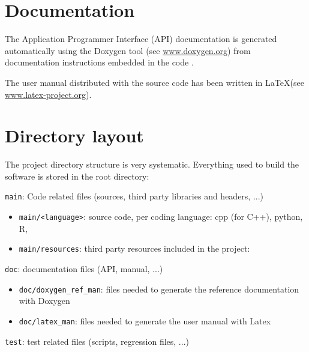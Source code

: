 %
\section{Documentation}
\label{section:documentation}

The Application Programmer Interface (API) documentation is generated automatically 
using the Doxygen tool (see \url{www.doxygen.org}) from documentation instructions 
embedded in the code . 

The user manual distributed with the source code has been written in \LaTeX (see \url{www.latex-project.org}).



%
\section{Directory layout}

The project directory structure is very systematic.
Everything used to build the software is stored in the root directory:
\begin{compactitem}
    \item \texttt{main}: Code related files (sources, third party libraries and headers, ...)
      	\begin{itemize}
        		\item \texttt{main/<language>}: source code, per coding language: cpp (for C++), python, R,   
        		\item \texttt{main/resources}: third party resources included in the project: 
        \end{itemize}
    \item \texttt{doc}: documentation files (API, manual, ...)
      	\begin{itemize}
        		\item \texttt{doc/doxygen\_ref\_man}: files needed to generate the reference documentation with Doxygen
        		\item \texttt{doc/latex\_man}: files needed to generate the user manual with Latex
        \end{itemize}
    \item \texttt{test}: test related files (scripts, regression files, ...)
\end{compactitem}

